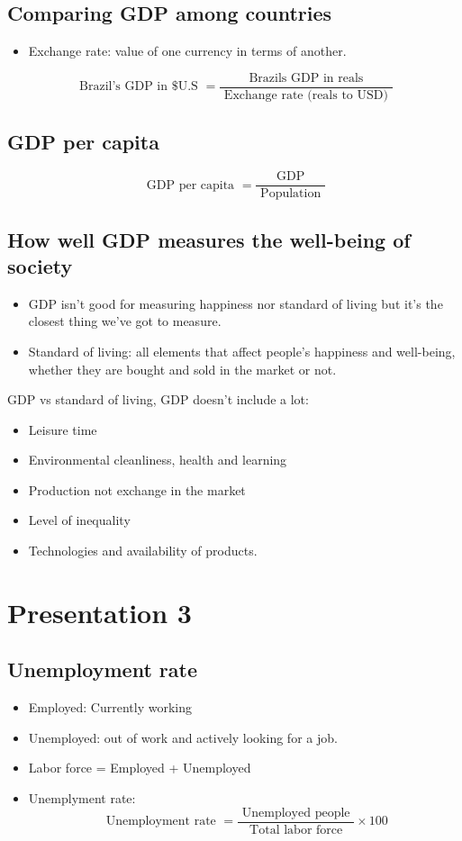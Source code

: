 \documentclass[openany]{book}
\begin{document}
\section{Comparing GDP among countries}
\begin{itemize}
    \item Exchange rate: value of one currency in terms of another. 
\end{itemize}
\[
    \text{ Brazil's GDP in \$U.S } = \frac{\text{ Brazils GDP in reals }}{\text{ Exchange rate (reals to USD) }} 
\]

\section{GDP per capita}
\[
  \text{ GDP per capita } = \frac{\text{ GDP }}{\text{ Population }} 
\]

\section{How well GDP measures the well-being of society}
\begin{itemize}
    \item GDP isn't good for measuring happiness nor standard of living but it's the closest thing we've got to measure. 
    \item Standard of living: all elements that affect people’s happiness and well-being, whether they are bought and sold in the market or not.
\end{itemize}
GDP vs standard of living, GDP doesn't include a lot: 
\begin{itemize}
    \item Leisure time 
    \item Environmental cleanliness, health and learning 
    \item Production not exchange in the market 
    \item Level of inequality
    \item Technologies and availability of products. 
\end{itemize}

\chapter{Presentation 3}
\section{Unemployment rate}
\begin{itemize}
    \item Employed: Currently working 
    \item Unemployed: out of work and actively looking for a job.
    \item Labor force = Employed + Unemployed 
    \item Unemplyment rate: 
        \[
          \text{ Unemployment rate } = \frac{\text{ Unemployed people }}{\text{ Total labor force }} \times 100 
        \]
\end{itemize}
\end{document}
